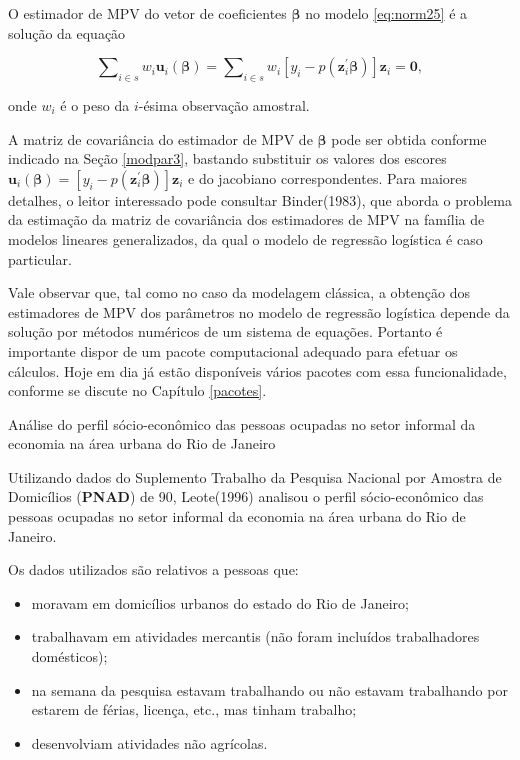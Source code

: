 \documentclass[]{book}
\theoremstyle{definition}
\theoremstyle{definition}
\theoremstyle{definition}
\theoremstyle{remark}
\let\BeginKnitrBlock\begin \let\EndKnitrBlock\end
\begin{document}
O estimador de MPV do vetor de coeficientes \(\mathbf{\beta }\) no
modelo \eqref{eq:norm25} é a solução da equação

\begin{equation}
\sum\nolimits_{i\in s}w_{i}\mathbf{u}_{i}\left( \mathbf{\beta }\right)
=\sum\nolimits_{i\in s}w_{i}\left[ y_{i}-p\left( \mathbf{z}_{i}^{\prime }
\mathbf{\beta }\right) \right] \mathbf{z}_{i}=\mathbf{0},
\label{eq:norm27}
\end{equation}

onde \(w_{i}\) é o peso da \(i\)-ésima observação amostral.

A matriz de covariância do estimador de MPV de \(\mathbf{\beta}\) pode
ser obtida conforme indicado na Seção \ref{modpar3}, bastando substituir
os valores dos escores
\(\mathbf{u}_{i}\left( \mathbf{\beta}\right) =\left[ y_{i}-p\left(\mathbf{z}_{i}^{\prime }\mathbf{\beta }\right)\right] \mathbf{z}_{i}\)
e do jacobiano correspondentes. Para maiores detalhes, o leitor
interessado pode consultar Binder(1983), que aborda o problema da
estimação da matriz de covariância dos estimadores de MPV na família de
modelos lineares generalizados, da qual o modelo de regressão logística
é caso particular.

Vale observar que, tal como no caso da modelagem clássica, a obtenção
dos estimadores de MPV dos parâmetros no modelo de regressão logística
depende da solução por métodos numéricos de um sistema de equações.
Portanto é importante dispor de um pacote computacional adequado para
efetuar os cálculos. Hoje em dia já estão disponíveis vários pacotes com
essa funcionalidade, conforme se discute no Capítulo \ref{pacotes}.

\BeginKnitrBlock{example}
\protect\hypertarget{exm:pnad6}{}{\label{exm:pnad6} }Análise do perfil
sócio-econômico das pessoas ocupadas no setor informal da economia na
área urbana do Rio de Janeiro
\EndKnitrBlock{example}

Utilizando dados do Suplemento Trabalho da Pesquisa Nacional por Amostra
de Domicílios (\textbf{PNAD}) de 90, Leote(1996) analisou o perfil
sócio-econômico das pessoas ocupadas no setor informal da economia na
área urbana do Rio de Janeiro.

Os dados utilizados são relativos a pessoas que:

\begin{itemize}
\item
  moravam em domicílios urbanos do estado do Rio de Janeiro;
\item
  trabalhavam em atividades mercantis (não foram incluídos trabalhadores
  domésticos);
\item
  na semana da pesquisa estavam trabalhando ou não estavam trabalhando
  por estarem de férias, licença, etc., mas tinham trabalho;
\item
  desenvolviam atividades não agrícolas.
\end{itemize}
\end{document}
